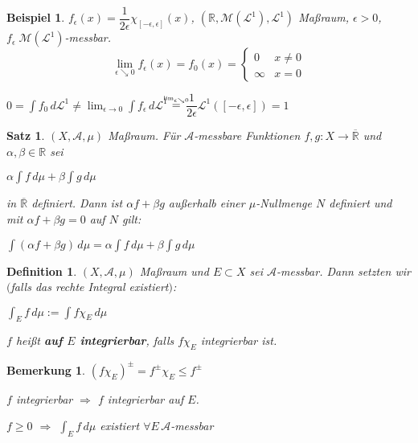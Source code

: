 \documentclass[11pt]{memoir}
\theoremstyle{changebreak}
\newtheorem{Definition}{Definition}[chapter]
\newtheorem{Bemerkung}{Bemerkung}[chapter]
\newtheorem{Beispiel}{Beispiel}[chapter]
\newtheorem{Satz}{Satz}[chapter]
\newcommand\overequal[1]{\mathrel{\overset{\makebox[0pt]{\mbox{\normalfont\tiny\sffamily $ #1 $}}}{=}}}
\begin{document}
\begin{Beispiel}
$f_{\epsilon} (x) = \dfrac{1}{2\epsilon} \chi_{[-\epsilon, \epsilon]}(x)$,
$(\mathbb R, \mathscr M(\mathscr L^1), \mathscr L^1)$ Maßraum, $\epsilon > 0$, $f_\epsilon \; \mathscr M(\mathscr L^1)$-messbar.
\begin{equation}
	\lim_{\epsilon \searrow 0} f_\epsilon (x) = f_0 (x) =
	\begin{cases}
		0 & x \ne 0 \\
		\infty & x = 0
	\end{cases}
\end{equation}
\begin{center}
	$0 = \int f_0 \, d\mathscr L^1 \ne \lim_{\epsilon \rightarrow 0} \int f_\epsilon \, d\mathscr L^1$ $\overequal{\lim_{\epsilon \searrow 0}}$ $\dfrac{1}{2\epsilon} \mathscr L^1([-\epsilon, \epsilon]) =1$
\end{center}
\end{Beispiel}


\begin{Satz}
$(X, \mathscr A, \mu)$ Maßraum. Für $\mathscr A$-messbare Funktionen $f, g: X \rightarrow \overline{\mathbb R} $ und $\alpha, \beta \in \mathbb R$ sei 
\begin{center}
	$\alpha\int f \, d\mu + \beta \int g \, d\mu$
\end{center} 
in $\overline{\mathbb R}$ definiert. Dann ist $\alpha f + \beta g$ außerhalb einer $\mu$-Nullmenge $N$ definiert und mit $\alpha f + \beta g = 0$ auf $N$ gilt: \\
\begin{center}
	$\int (\alpha f + \beta g) \, d\mu = \alpha \int f \, d\mu + \beta \int g \, d\mu$
\end{center}
\end{Satz}

\begin{Definition}
$(X, \mathscr A, \mu)$ Maßraum und $E \subset X$ sei $\mathscr A$-messbar. Dann setzten wir $($falls das rechte Integral existiert$)$:
\begin{center}
	$\int_E f \, d\mu := \int f \chi_E \, d\mu$
\end{center}
$f$ heißt \textbf{auf $E$ integrierbar}, falls $f \chi_E$ integrierbar ist.
\end{Definition}

\begin{Bemerkung}
$(f \chi_E)^\pm = f^\pm \chi_E \leq f^\pm$ 
\par\bigskip
$f$ integrierbar $\Rightarrow$ $f$ integrierbar auf $E$. 
\par
$f \geq 0$ $\Rightarrow$ $\int_E f \, d\mu$ existiert $\forall E \, \mathscr A$-messbar
\end{Bemerkung}
\end{document}

